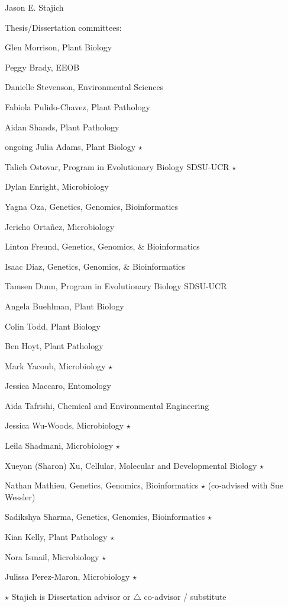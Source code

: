 \documentclass[10pt]{article}
\begin{document}
\begin{cv}{\centerline{Jason E. Stajich}}
\begin{cvlistcompact}{Thesis/Dissertation committees:}
\item Glen Morrison, Plant Biology
\item Peggy Brady, EEOB
\item Danielle Stevenson, Environmental Sciences
\item Fabiola Pulido-Chavez, Plant Pathology
\item Aidan Shands, Plant Pathology
\item [ongoing] Julia Adams, Plant Biology $\star$
\item Talieh Ostovar, Program in Evolutionary Biology SDSU-UCR $\star$
\item Dylan Enright, Microbiology
\item Yagna Oza, Genetics, Genomics, Bioinformatics
\item Jericho Orta\~{n}ez, Microbiology
\item Linton Freund, Genetics, Genomics, \& Bioinformatics
\item Isaac Diaz, Genetics, Genomics, \& Bioinformatics
\item Tamsen Dunn, Program in Evolutionary Biology SDSU-UCR
\item Angela Buehlman, Plant Biology
\item Colin Todd, Plant Biology
\item Ben Hoyt, Plant Pathology
\item Mark Yacoub, Microbiology $\star$
\item Jessica Maccaro, Entomology
\item Aida Tafrishi, Chemical and Environmental Engineering
\item Jessica Wu-Woods, Microbiology $\star$
\item Leila Shadmani, Microbiology $\star$
\item Xueyan (Sharon) Xu, Cellular, Molecular and Developmental Biology $\star$
\item Nathan Mathieu, Genetics, Genomics, Bioinformatics $\star$ (co-advised with Sue Wessler)
\item Sadikshya Sharma, Genetics, Genomics, Bioinformatics $\star$
\item Kian Kelly, Plant Pathology $\star$
\item Nora Ismail, Microbiology $\star$
\item Julissa Perez-Maron, Microbiology $\star$

\end{cvlistcompact}
$\star$ Stajich is Dissertation advisor or $\triangle$ co-advisor / substitute


\end{cv}
\end{document}
